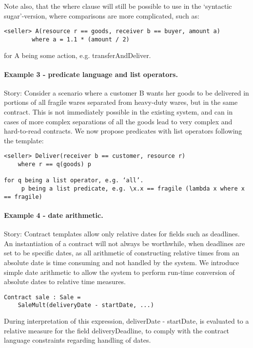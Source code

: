 \documentclass[a4paper,oneside, final, twocolumn]{memoir}
\begin{document}
Note also, that the where clause will still be possible to use in the ‘syntactic
sugar’-version, where comparisons are more complicated, such as:

\begin{verbatim}
<seller> A(resource r == goods, receiver b == buyer, amount a)
		where a = 1.1 * (amount / 2)
\end{verbatim}

for A being some action, e.g. transferAndDeliver.


\paragraph{Example 3 - predicate language and list operators.}
Story: Consider a scenario where a customer B wants her goods to be delivered in
portions of all fragile wares separated from heavy-duty wares, but in the same
contract. This is not immediately possible in the existing system, and can in
cases of more complex separations of all the goods lead to very complex and
hard-to-read contracts. We now propose predicates with list operators following
the template:

\begin{verbatim}
<seller> Deliver(receiver b == customer, resource r)
	where r == q(goods) p

for q being a list operator, e.g. ‘all’.
     p being a list predicate, e.g. \x.x == fragile (lambda x where x == fragile)
\end{verbatim}

\paragraph{Example 4 - date arithmetic.}
Story: Contract templates allow only relative dates for fields such as
deadlines. An instantiation of a contract will not always be worthwhile, when
deadlines are set to be specific dates, as all arithmetic of constructing
relative times from an absolute date is time consuming and not handled by the
system. We introduce simple date arithmetic to allow the system to perform
run-time conversion of absolute dates to relative time measures.

\begin{verbatim}
Contract sale : Sale =
	SaleMult(deliveryDate - startDate, ...)
\end{verbatim}

During interpretation of this expression, deliverDate - startDate, is evaluated
to a relative measure for the field deliveryDeadline, to comply with the
contract language constraints regarding handling of dates.
\end{document}
